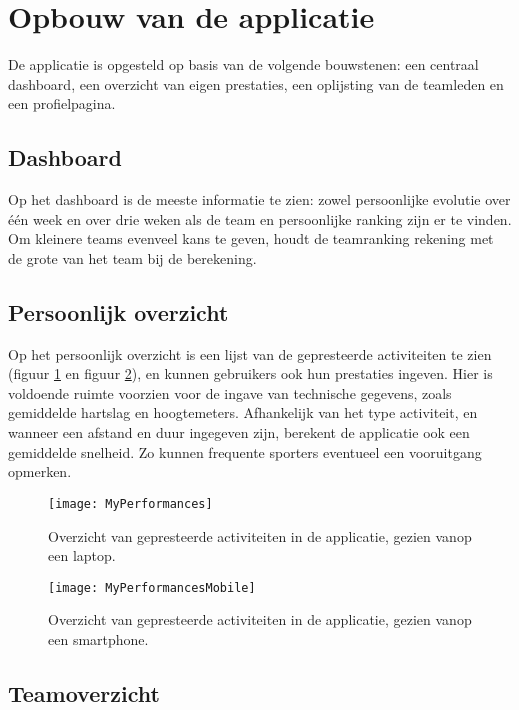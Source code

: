 \section{Opbouw van de applicatie}

De applicatie is opgesteld op basis van de volgende bouwstenen: een centraal dashboard, een overzicht van eigen prestaties, een oplijsting van de teamleden en een profielpagina.

\subsection{Dashboard}
Op het dashboard is de meeste informatie te zien: zowel persoonlijke evolutie over één week en over drie weken als de team en persoonlijke ranking zijn er te vinden. Om kleinere teams evenveel kans te geven, houdt de teamranking rekening met de grote van het team bij de berekening.

\subsection{Persoonlijk overzicht}
Op het persoonlijk overzicht is een lijst van de gepresteerde activiteiten te zien (figuur \ref{fig:performances} en figuur \ref{fig:performancesMobile}), en kunnen gebruikers ook hun prestaties ingeven. Hier is voldoende ruimte voorzien voor de ingave van technische gegevens, zoals gemiddelde hartslag en hoogtemeters. Afhankelijk van het type activiteit, en wanneer een afstand en duur ingegeven zijn, berekent de applicatie ook een gemiddelde snelheid. Zo kunnen frequente sporters eventueel een vooruitgang opmerken.

\begin{figure}[h]
    \caption[Overzicht activiteiten website]{Overzicht van gepresteerde activiteiten in de applicatie, gezien vanop een laptop.}
    \texttt{[image: MyPerformances]}
    \label{fig:performances}
\end{figure}

\begin{figure}[h]
    \caption[Overzicht activiteiten website smartphone]{Overzicht van gepresteerde activiteiten in de applicatie, gezien vanop een smartphone.}
    \texttt{[image: MyPerformancesMobile]}
    \label{fig:performancesMobile}
\end{figure}

\subsection{Teamoverzicht}

